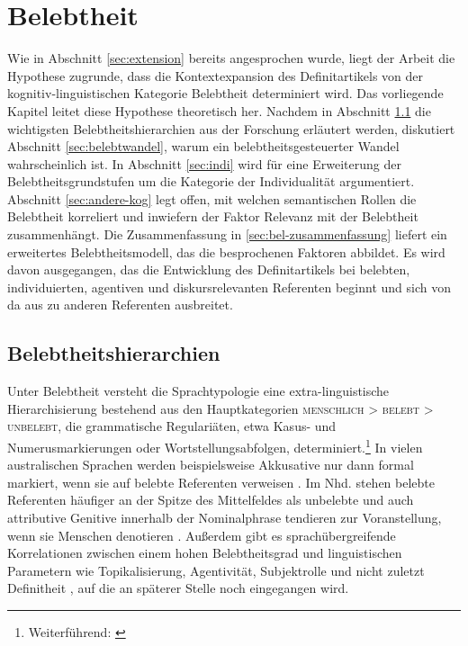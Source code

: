 \chapter{Belebtheit} \label{chapter:belebtheit}

Wie in Abschnitt \ref{sec:extension} bereits angesprochen wurde, liegt der Arbeit  die Hypothese zugrunde, dass die Kontextexpansion des Definitartikels von der kognitiv-linguistischen Kategorie Belebtheit determiniert wird. Das vorliegende Kapitel leitet diese Hypothese theoretisch her. Nachdem in Abschnitt \ref{sec:belebt} die wichtigsten Belebtheitshierarchien aus der Forschung erläutert werden, diskutiert Abschnitt \ref{sec:belebtwandel}, warum ein belebtheitsgesteuerter Wandel wahrscheinlich ist. In Abschnitt \ref{sec:indi} wird für eine Erweiterung der Belebtheitsgrundstufen um die Kategorie der Individualität argumentiert. Abschnitt \ref{sec:andere-kog} legt offen, mit welchen semantischen Rollen die Belebtheit korreliert und inwiefern der Faktor Relevanz mit der Belebtheit zusammenhängt. Die Zusammenfassung in \ref{sec:bel-zusammenfassung} liefert ein erweitertes Belebtheitsmodell, das die besprochenen Faktoren abbildet. Es wird davon ausgegangen, das die Entwicklung des Definitartikels bei belebten, individuierten, agentiven und diskursrelevanten Referenten beginnt und sich von da aus zu anderen Referenten ausbreitet. 

\section{Belebtheitshierarchien}\label{sec:belebt}

Unter Belebtheit versteht die Sprachtypologie eine extra-linguistische Hierarchisierung bestehend aus den Hauptkategorien \textsc{menschlich > belebt > unbelebt}, die grammatische Regulariäten, etwa Kasus- und Numerusmarkierungen oder Wortstellungsabfolgen, determiniert.\footnote{Weiterführend:  \cite{Silverstein1976,Allan1987,Comrie1989,Langacker1991,Dahl1996,Yamamoto1999,Yamamoto2006,Croft1995,Croft2006,Dixon1995, Corbett2000,Aissen2003,Zifonun2006, Dahl2008}} In vielen australischen Sprachen werden beispielsweise Akkusative nur dann formal markiert, wenn sie auf belebte Referenten verweisen \parencite[189]{Comrie1989}. 
Im Nhd. stehen belebte Referenten häufiger an der Spitze des Mittelfeldes als unbelebte \parencite{Kempen2004} und auch attributive Genitive innerhalb der Nominalphrase tendieren zur Voranstellung, wenn sie Menschen denotieren  \parencite{Hartmann2003}. Außerdem gibt es sprachübergreifende Korrelationen zwischen einem hohen Belebtheitsgrad und linguistischen Parametern wie Topikalisierung, Agentivität, Subjektrolle und nicht zuletzt Definitheit \parencite{Comrie1989, Yamamoto2006}, auf die an späterer Stelle noch eingegangen wird. 

